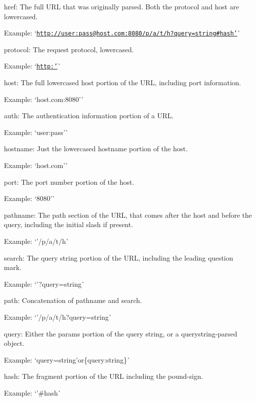 \begin{DoxyItemize}
\item {\ttfamily href}\+: The full U\+RL that was originally parsed. Both the protocol and host are lowercased.

Example\+: `\textquotesingle{}\href{http://user:pass@host.com:8080/p/a/t/h?query=string#hash&rsquo;}{\tt http\+://user\+:pass@host.\+com\+:8080/p/a/t/h?query=string\#hash'}\`{}
\item {\ttfamily protocol}\+: The request protocol, lowercased.

Example\+: `\textquotesingle{}\href{http:&rsquo;}{\tt http\+:'}\`{}
\item {\ttfamily host}\+: The full lowercased host portion of the U\+RL, including port information.

Example\+: `\textquotesingle{}host.\+com\+:8080'\`{}
\item {\ttfamily auth}\+: The authentication information portion of a U\+RL.

Example\+: `\textquotesingle{}user\+:pass'\`{}
\item {\ttfamily hostname}\+: Just the lowercased hostname portion of the host.

Example\+: `\textquotesingle{}host.\+com'\`{}
\item {\ttfamily port}\+: The port number portion of the host.

Example\+: `\textquotesingle{}8080'\`{}
\item {\ttfamily pathname}\+: The path section of the U\+RL, that comes after the host and before the query, including the initial slash if present.

Example\+: `'/p/a/t/h\textquotesingle{}\`{}
\item {\ttfamily search}\+: The \textquotesingle{}query string\textquotesingle{} portion of the U\+RL, including the leading question mark.

Example\+: `'?query=string\textquotesingle{}\`{}
\item {\ttfamily path}\+: Concatenation of {\ttfamily pathname} and {\ttfamily search}.

Example\+: `'/p/a/t/h?query=string\textquotesingle{}\`{}
\item {\ttfamily query}\+: Either the \textquotesingle{}params\textquotesingle{} portion of the query string, or a querystring-\/parsed object.

Example\+: `\textquotesingle{}query=string'{\ttfamily or}\{\textquotesingle{}query\textquotesingle{}\+:\textquotesingle{}string\textquotesingle{}\}\`{}
\item {\ttfamily hash}\+: The \textquotesingle{}fragment\textquotesingle{} portion of the U\+RL including the pound-\/sign.

Example\+: `'\#hash\textquotesingle{}\`{}
\end{DoxyItemize}

